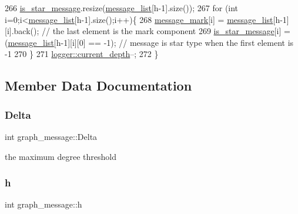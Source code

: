 \begin{DoxyCode}
266   \hyperlink{classgraph__message_a55ff5531a0043106369e84a7bc45e22d}{is\_star\_message}.resize(\hyperlink{classgraph__message_aa17fdb629b423343edfafa97252763ef}{message\_list}[h-1].size());
267   \textcolor{keywordflow}{for} (\textcolor{keywordtype}{int} i=0;i<\hyperlink{classgraph__message_aa17fdb629b423343edfafa97252763ef}{message\_list}[h-1].size();i++)\{
268     \hyperlink{classgraph__message_a49d9af5150daf0599c29fe18cb032fa5}{message\_mark}[i] = \hyperlink{classgraph__message_aa17fdb629b423343edfafa97252763ef}{message\_list}[h-1][i].back(); \textcolor{comment}{// the last element is the mark
       component}
269     \hyperlink{classgraph__message_a55ff5531a0043106369e84a7bc45e22d}{is\_star\_message}[i] = (\hyperlink{classgraph__message_aa17fdb629b423343edfafa97252763ef}{message\_list}[h-1][i][0] == -1); \textcolor{comment}{// message is star
       type when the first element is -1}
270   \}
271   \hyperlink{classlogger_a9d29b49bd318a719a8e85b59eac54fe0}{logger::current\_depth}--;
272 \}
\end{DoxyCode}


\subsection{Member Data Documentation}
\mbox{\label{classgraph__message_a45dfd061b7bc73572e5132fbf66efd55}} 
\subsubsection{\texorpdfstring{Delta}{Delta}}
{\footnotesize\ttfamily int graph\+\_\+message\+::\+Delta\hspace{0.3cm}{\ttfamily [private]}}



the maximum degree threshold 

\mbox{\label{classgraph__message_a934d63ed7275c211e13c6fb68824ed46}} 
\subsubsection{\texorpdfstring{h}{h}}
{\footnotesize\ttfamily int graph\+\_\+message\+::h\hspace{0.3cm}{\ttfamily [private]}}



